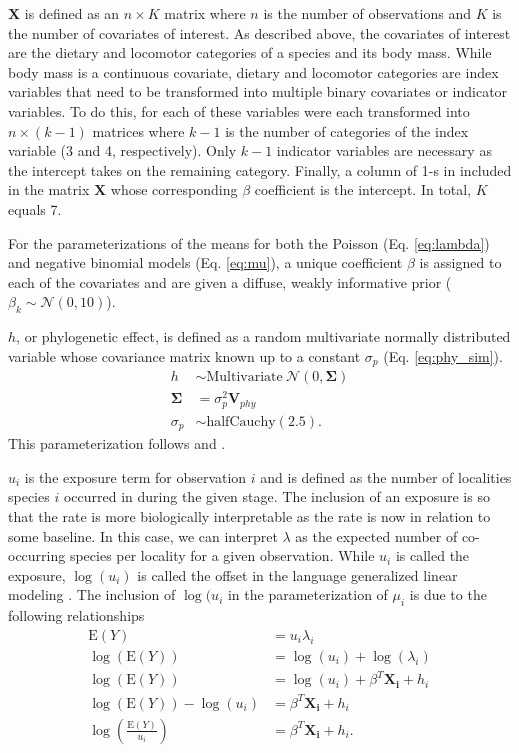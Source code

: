 \documentclass[12pt,letterpaper]{article}
\begin{document}
\(\mathbf{X}\) is defined as an \(n \times K\) matrix where \(n\) is the number of observations and \(K\) is the number of covariates of interest. As described above, the covariates of interest are the dietary and locomotor categories of a species and its body mass. While body mass is a continuous covariate, dietary and locomotor categories are index variables that need to be transformed into multiple binary covariates or indicator variables. To do this, for each of these variables were each transformed into \(n \times (k - 1)\) matrices where \(k - 1\) is the number of categories of the index variable (3 and 4, respectively). Only \(k - 1\) indicator variables are necessary as the intercept takes on the remaining category. Finally, a column of 1-s in included in the matrix \(\mathbf{X}\) whose corresponding \(\beta\) coefficient is the intercept. In total, \(K\) equals 7.

For the parameterizations of the means for both the Poisson (Eq. \ref{eq:lambda}) and negative binomial models (Eq. \ref{eq:mu}), a unique coefficient \(\beta\) is assigned to each of the covariates and are given a diffuse, weakly informative prior (\(\beta_{k} \sim \mathcal{N}(0, 10)\)).

\(h\), or phylogenetic effect, is defined as a random multivariate normally distributed variable whose covariance matrix known up to a constant \(\sigma_{p}\) (Eq. \ref{eq:phy_sim}).
\begin{align}
  h &\sim \mathrm{Multivariate\ }\mathcal{N}(0, \mathbf{\Sigma}) \label{eq:phy_sim} \\
  \mathbf{\Sigma} &= \sigma_{p}^{2} \mathbf{V}_{phy} \nonumber \\
  \sigma_{p} &\sim \mathrm{halfCauchy}(2.5). \nonumber
\end{align}
This parameterization follows \citet{Lynch1991} and \citet{Housworth2004}.

\(u_{i}\) is the exposure term for observation \(i\) and is defined as the number of localities species \(i\) occurred in during the given stage. The inclusion of an exposure is so that the rate is more biologically interpretable as the rate is now in relation to some baseline. In this case, we can interpret \(\lambda\) as the expected number of co-occurring species per locality for a given observation. While \(u_{i}\) is called the exposure, \(\log(u_{i})\) is called the offset in the language generalized linear modeling \citep{Gelman2007}. The inclusion of \(\log(u_{i}\) in the parameterization of \(\mu_{i}\) is due to the following relationships 
\begin{align*}
  \mathrm{E}(Y) &= u_{i}\lambda_{i} \\
  \log(\mathrm{E}(Y)) &= \log(u_{i}) + \log(\lambda_{i}) \\
  \log(\mathrm{E}(Y)) &= \log(u_{i}) + \beta^{T}\mathbf{X_{i}} + h_{i} \\
  \log(\mathrm{E}(Y)) - \log(u_{i}) &= \beta^{T}\mathbf{X_{i}} + h_{i} \\
  \log\left(\frac{\mathrm{E}(Y)}{u_{i}}\right) &= \beta^{T}\mathbf{X_{i}} + h_{i}.
\end{align*}
\end{document}
